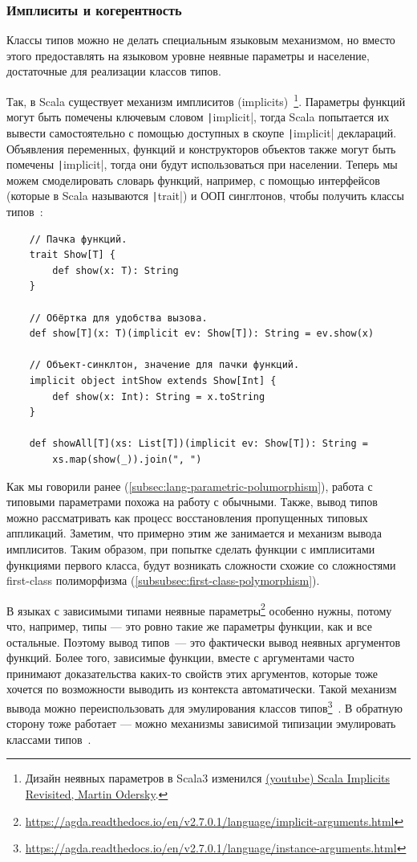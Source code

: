 \subsubsection{Имплиситы и когерентность}

Классы типов можно не делать специальным языковым механизмом, но вместо этого предоставлять на языковом уровне неявные параметры и население, достаточные для реализации классов типов.

Так, в Scala существует механизм имплиситов (implicits)~\cite{kvrikava2019scala}\footnote{Дизайн неявных параметров в Scala3 изменился \href{https://youtu.be/dr0PUXQhg3M?si=pCydSikA_gnnCMrq}{(youtube) Scala Implicits Revisited, Martin Odersky}.}.
Параметры функций могут быть помечены ключевым словом \texttt|implicit|, тогда Scala попытается их вывести самостоятельно с помощью доступных в скоупе \texttt|implicit| деклараций.
Объявления переменных, функций и конструкторов объектов также могут быть помечены \texttt|implicit|, тогда они будут использоваться при населении.
Теперь мы можем смоделировать словарь функций, например, с помощью интерфейсов (которые в Scala называются \texttt|trait|) и ООП синглтонов, чтобы получить классы типов~\cite{oliveira2010type}:
\begin{verbatim}
    // Пачка функций.
    trait Show[T] {
        def show(x: T): String
    }

    // Обёртка для удобства вызова.
    def show[T](x: T)(implicit ev: Show[T]): String = ev.show(x)

    // Объект-синклтон, значение для пачки функций.
    implicit object intShow extends Show[Int] {
        def show(x: Int): String = x.toString
    }

    def showAll[T](xs: List[T])(implicit ev: Show[T]): String =
        xs.map(show(_)).join(", ")
\end{verbatim}

Как мы говорили ранее (\ref{subsec:lang-parametric-polumorphism}), работа с типовыми параметрами похожа на работу с обычными.
Также, вывод типов можно рассматривать как процесс восстановления пропущенных типовых аппликаций.
Заметим, что примерно этим же занимается и механизм вывода имплиситов.
Таким образом, при попытке сделать функции с имплиситами функциями первого класса, будут возникать сложности схожие со сложностями first-class полиморфизма (\ref{subsubsec:first-class-polymorphism}).

В языках с зависимыми типами неявные параметры\footnote{\url{https://agda.readthedocs.io/en/v2.7.0.1/language/implicit-arguments.html}} особенно нужны, потому что, например, типы --- это ровно такие же параметры функции, как и все остальные.
Поэтому вывод типов~--- это фактически вывод неявных аргументов функций.
Более того, зависимые функции, вместе с аргументами часто принимают доказательства каких-то свойств этих аргументов, которые тоже хочется по возможности выводить из контекста автоматически.
Такой механизм вывода можно переиспользовать для эмулирования классов типов\footnote{\url{https://agda.readthedocs.io/en/v2.7.0.1/language/instance-arguments.html}}~\cite{devriese2011bright}.
В обратную сторону тоже работает --- можно механизмы зависимой типизации эмулировать классами типов~\cite{mcbride2002faking}.

